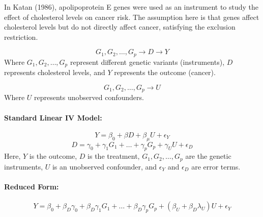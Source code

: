 In Katan (1986), apolipoprotein E genes were used as an instrument to study the effect of cholesterol levels on cancer risk. The assumption here is that genes affect cholesterol levels but do not directly affect cancer, satisfying the exclusion restriction.

\begin{center}
\end{center}

$$G_1, G_2, \dots, G_p \rightarrow D \rightarrow Y$$
Where $G_1, G_2, \dots, G_p$ represent different genetic variants (instruments), $D$ represents cholesterol levels, and $Y$ represents the outcome (cancer). 

$$G_1, G_2, \dots, G_p \rightarrow U$$
Where $U$ represents unobserved confounders.

\paragraph*{Standard Linear IV Model:}
$$Y = \beta_0 + \beta D + \beta_\mu U + \epsilon_Y$$
$$D = \gamma_0 + \gamma_1 G_1 + \dots + \gamma_p G_p + \gamma_U U + \epsilon_D$$
Here, $Y$ is the outcome, $D$ is the treatment, $G_1, G_2, \dots, G_p$ are the genetic instruments, $U$ is an unobserved confounder, and $\epsilon_Y$ and $\epsilon_D$ are error terms.

\paragraph*{ Reduced Form:}
$$Y = \beta_0 + \beta_D \gamma_0 + \beta_D \gamma_1 G_1 + \dots + \beta_D \gamma_p G_p + (\beta_U + \beta_D \lambda_U) U + \epsilon_Y$$


